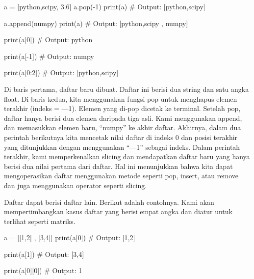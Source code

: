 \documentclass[
  letterpaper,
  DIV=11,
  numbers=noendperiod]{scrreprt}
\newenvironment{Shaded}{\begin{snugshade}}{\end{snugshade}}
\newcommand{\BuiltInTok}[1]{\textcolor[rgb]{0.00,0.23,0.31}{#1}}
\newcommand{\CommentTok}[1]{\textcolor[rgb]{0.37,0.37,0.37}{#1}}
\newcommand{\DecValTok}[1]{\textcolor[rgb]{0.68,0.00,0.00}{#1}}
\newcommand{\FloatTok}[1]{\textcolor[rgb]{0.68,0.00,0.00}{#1}}
\newcommand{\NormalTok}[1]{\textcolor[rgb]{0.00,0.23,0.31}{#1}}
\newcommand{\OperatorTok}[1]{\textcolor[rgb]{0.37,0.37,0.37}{#1}}
\newcommand{\StringTok}[1]{\textcolor[rgb]{0.13,0.47,0.30}{#1}}
\begin{document}
\begin{Shaded}
\begin{Highlighting}[]
\NormalTok{a }\OperatorTok{=}\NormalTok{ [}\StringTok{\textquotesingle{}python\textquotesingle{}}\NormalTok{,}\StringTok{\textquotesingle{}scipy\textquotesingle{}}\NormalTok{, }\FloatTok{3.6}\NormalTok{]}
\NormalTok{a.pop(}\OperatorTok{{-}}\DecValTok{1}\NormalTok{)}
\BuiltInTok{print}\NormalTok{(a)}
\CommentTok{\# Output: [\textquotesingle{}python\textquotesingle{},\textquotesingle{}scipy\textquotesingle{}]}

\NormalTok{a.append(}\StringTok{\textquotesingle{}numpy\textquotesingle{}}\NormalTok{)}
\BuiltInTok{print}\NormalTok{(a)}
\CommentTok{\# Output: [\textquotesingle{}python\textquotesingle{},\textquotesingle{}scipy\textquotesingle{} , \textquotesingle{}numpy\textquotesingle{}]}

\BuiltInTok{print}\NormalTok{(a[}\DecValTok{0}\NormalTok{])}
\CommentTok{\# Output: python}

\BuiltInTok{print}\NormalTok{(a[}\OperatorTok{{-}}\DecValTok{1}\NormalTok{])}
\CommentTok{\# Output: numpy}

\BuiltInTok{print}\NormalTok{(a[}\DecValTok{0}\NormalTok{:}\DecValTok{2}\NormalTok{])}
\CommentTok{\# Output: [\textquotesingle{}python\textquotesingle{},\textquotesingle{}scipy\textquotesingle{}]}
\end{Highlighting}
\end{Shaded}

Di baris pertama, daftar baru dibuat. Daftar ini berisi dua string dan
satu angka float. Di baris kedua, kita menggunakan fungsi pop untuk
menghapus elemen terakhir (indeks = ---1). Elemen yang di-pop dicetak ke
terminal. Setelah pop, daftar hanya berisi dua elemen daripada tiga
asli. Kami menggunakan append, dan memasukkan elemen baru, ``numpy'' ke
akhir daftar. Akhirnya, dalam dua perintah berikutnya kita mencetak
nilai daftar di indeks 0 dan posisi terakhir yang ditunjukkan dengan
menggunakan ``---1'' sebagai indeks. Dalam perintah terakhir, kami
memperkenalkan slicing dan mendapatkan daftar baru yang hanya berisi dua
nilai pertama dari daftar. Hal ini menunjukkan bahwa kita dapat
mengoperasikan daftar menggunakan metode seperti pop, insert, atau
remove dan juga menggunakan operator seperti slicing.

Daftar dapat berisi daftar lain. Berikut adalah contohnya. Kami akan
mempertimbangkan kasus daftar yang berisi empat angka dan diatur untuk
terlihat seperti matriks.

\begin{Shaded}
\begin{Highlighting}[]
\NormalTok{a }\OperatorTok{=}\NormalTok{ [[}\DecValTok{1}\NormalTok{,}\DecValTok{2}\NormalTok{] , [}\DecValTok{3}\NormalTok{,}\DecValTok{4}\NormalTok{]]}
\BuiltInTok{print}\NormalTok{(a[}\DecValTok{0}\NormalTok{])}
\CommentTok{\# Output: [1,2]}

\BuiltInTok{print}\NormalTok{(a[}\DecValTok{1}\NormalTok{])}
\CommentTok{\# Output: [3,4]}

\BuiltInTok{print}\NormalTok{(a[}\DecValTok{0}\NormalTok{][}\DecValTok{0}\NormalTok{])}
\CommentTok{\# Output: 1}
\end{Highlighting}
\end{Shaded}
\end{document}
